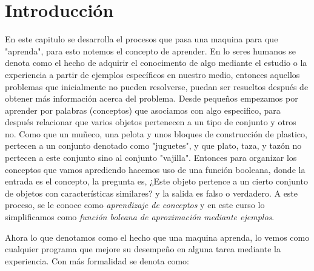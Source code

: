 \section{Introducción}

En este capitulo se desarrolla el procesos que pasa una maquina para que "aprenda", para esto notemos el concepto de aprender. En lo seres humanos se denota como el hecho de adquirir el conocimento de algo mediante el estudio o la experiencia a partir de ejemplos específicos en nuestro medio, entonces aquellos problemas que inicialmente no pueden resolverse, puedan ser resueltos después de obtener más información acerca del problema. Desde pequeños empezamos por aprender por palabras (conceptos) que asociamos con algo especifico, para después relacionar que varios objetos pertenecen a un tipo de conjunto y otros no. Como que un muñeco, una pelota y unos bloques de construcción de plastico, pertecen a un conjunto denotado como "juguetes", y que plato, taza, y tazón no pertecen a este conjunto sino al conjunto "vajilla". Entonces para organizar los conceptos que vamos aprediendo hacemos uso de una función booleana, donde la entrada es el concepto, la pregunta es, ¿Este objeto pertence a un cierto conjunto de objetos con características similares? y la salida es falso o verdadero. A este proceso, se le conoce como \emph{aprendizaje de conceptos} y en este curso lo simplificamos como \emph{función boleana de aproximación mediante ejemplos}.

Ahora lo que denotamos como el hecho que una maquina aprenda, lo vemos como cualquier programa que mejore su desempeño en alguna tarea mediante la experiencia. Con más formalidad se denota como:

